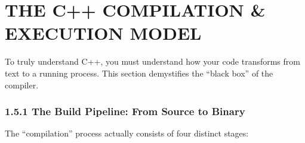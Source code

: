 \hypertarget{the-c-compilation-execution-model}{%
\chapter{THE C++ COMPILATION \& EXECUTION
MODEL}\label{the-c-compilation-execution-model}}

To truly understand C++, you must understand how your code transforms
from text to a running process. This section demystifies the ``black
box'' of the compiler.

\hypertarget{the-build-pipeline-from-source-to-binary}{%
\subsection{1.5.1 The Build Pipeline: From Source to
Binary}\label{the-build-pipeline-from-source-to-binary}}

The ``compilation'' process actually consists of four distinct stages:

